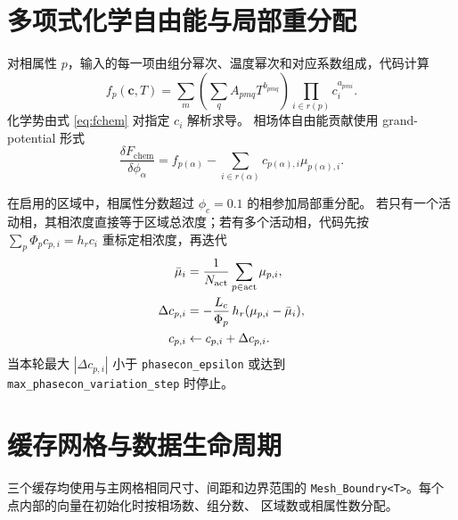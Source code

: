 \documentclass[UTF8,a4paper,11pt]{ctexart}
\newcommand{\vct}[1]{\bm{#1}}
\newcommand{\code}[1]{\texttt{#1}}
\begin{document}
\section{多项式化学自由能与局部重分配}

对相属性 $p$，输入的每一项由组分幂次、温度幂次和对应系数组成，代码计算
\begin{equation}
 f_p(\vct c,T)=\sum_m
 \left(\sum_q A_{pmq}T^{b_{pmq}}\right)
 \prod_{i\in r(p)}c_i^{a_{pmi}}.
 \label{eq:fchem}
\end{equation}
化学势由式 \eqref{eq:fchem} 对指定 $c_i$ 解析求导。
相场体自由能贡献使用 grand-potential 形式
\begin{equation}
 \frac{\delta F_{\mathrm{chem}}}{\delta\phi_\alpha}
 =f_{p(\alpha)}-\sum_{i\in r(\alpha)}c_{p(\alpha),i}\mu_{p(\alpha),i}.
\end{equation}

在启用的区域中，相属性分数超过 $\phi_c=0.1$ 的相参加局部重分配。
若只有一个活动相，其相浓度直接等于区域总浓度；若有多个活动相，代码先按
$\sum_p\Phi_pc_{p,i}=h_rc_i$ 重标定相浓度，再迭代
\begin{align}
 \bar\mu_i&={1\over N_{\mathrm{act}}}\sum_{p\in\mathrm{act}}\mu_{p,i},\\
 \Delta c_{p,i}&=-{L_c\over\Phi_p}\,h_r(\mu_{p,i}-\bar\mu_i),\\
 c_{p,i}&\leftarrow c_{p,i}+\Delta c_{p,i}.
 \label{eq:minimization}
\end{align}
当本轮最大 $|\Delta c_{p,i}|$ 小于 \code{phasecon\_epsilon} 或达到
\code{max\_phasecon\_variation\_step} 时停止。

\section{缓存网格与数据生命周期}

三个缓存均使用与主网格相同尺寸、间距和边界范围的
\code{Mesh\_Boundry<T>}。每个点内部的向量在初始化时按相场数、组分数、
区域数或相属性数分配。
\end{document}
